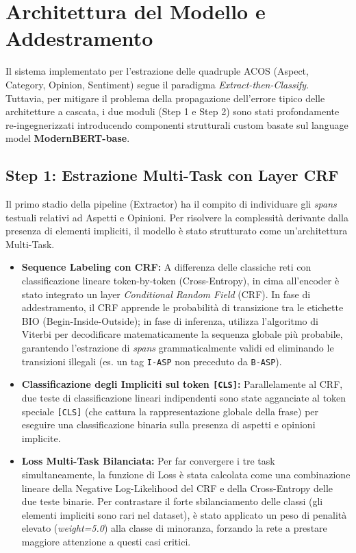 \documentclass[10pt,a4paper]{report}
\begin{document}
\chapter{Architettura del Modello e Addestramento}
\label{sec:architecture}

Il sistema implementato per l'estrazione delle quadruple ACOS (Aspect, Category, Opinion, Sentiment) segue il paradigma \textit{Extract-then-Classify}. Tuttavia, per mitigare il problema della propagazione dell'errore tipico delle architetture a cascata, i due moduli (Step 1 e Step 2) sono stati profondamente re-ingegnerizzati introducendo componenti strutturali custom basate sul language model \textbf{ModernBERT-base}.

\section{Step 1: Estrazione Multi-Task con Layer CRF}
Il primo stadio della pipeline (Extractor) ha il compito di individuare gli \textit{spans} testuali relativi ad Aspetti e Opinioni. Per risolvere la complessità derivante dalla presenza di elementi impliciti, il modello è stato strutturato come un'architettura Multi-Task.

\begin{itemize}
    \item \textbf{Sequence Labeling con CRF:} A differenza delle classiche reti con classificazione lineare token-by-token (Cross-Entropy), in cima all'encoder è stato integrato un layer \textit{Conditional Random Field} (CRF). In fase di addestramento, il CRF apprende le probabilità di transizione tra le etichette BIO (Begin-Inside-Outside); in fase di inferenza, utilizza l'algoritmo di Viterbi per decodificare matematicamente la sequenza globale più probabile, garantendo l'estrazione di \textit{spans} grammaticalmente validi ed eliminando le transizioni illegali (es. un tag \texttt{I-ASP} non preceduto da \texttt{B-ASP}).
    \item \textbf{Classificazione degli Impliciti sul token \texttt{[CLS]}:} Parallelamente al CRF, due teste di classificazione lineari indipendenti sono state agganciate al token speciale \texttt{[CLS]} (che cattura la rappresentazione globale della frase) per eseguire una classificazione binaria sulla presenza di aspetti e opinioni implicite.
    \item \textbf{Loss Multi-Task Bilanciata:} Per far convergere i tre task simultaneamente, la funzione di Loss è stata calcolata come una combinazione lineare della Negative Log-Likelihood del CRF e della Cross-Entropy delle due teste binarie. Per contrastare il forte sbilanciamento delle classi (gli elementi impliciti sono rari nel dataset), è stato applicato un peso di penalità elevato (\textit{weight=5.0}) alla classe di minoranza, forzando la rete a prestare maggiore attenzione a questi casi critici.
\end{itemize}
\end{document}

